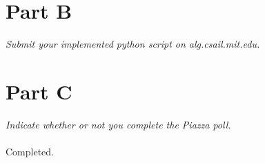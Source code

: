 \documentclass[12pt,twoside]{article}
\begin{document}
\begin{problems}
\section*{Part B}

\emph{Submit your implemented python script on alg.csail.mit.edu.}

\section*{Part C}

\emph{Indicate whether or not you complete the Piazza poll.}\\ \\
Completed.
\end{problems}
\end{document}
